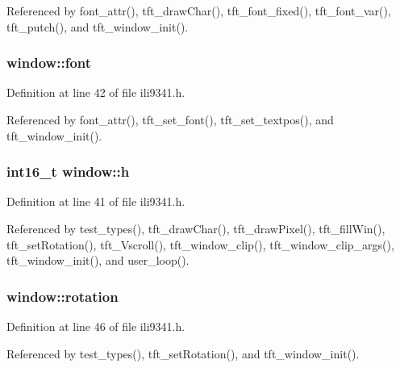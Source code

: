 Referenced by font\+\_\+attr(), tft\+\_\+draw\+Char(), tft\+\_\+font\+\_\+fixed(), tft\+\_\+font\+\_\+var(), tft\+\_\+putch(), and tft\+\_\+window\+\_\+init().

\subsubsection[{\texorpdfstring{font}{font}}]{ window\+::font}\hypertarget{structwindow_acee24e56db43557a46cbb5ca3fe35021}{}\label{structwindow_acee24e56db43557a46cbb5ca3fe35021}


Definition at line 42 of file ili9341.\+h.



Referenced by font\+\_\+attr(), tft\+\_\+set\+\_\+font(), tft\+\_\+set\+\_\+textpos(), and tft\+\_\+window\+\_\+init().

\subsubsection[{\texorpdfstring{h}{h}}]{\setlength{\rightskip}{0pt plus 5cm}int16\+\_\+t window\+::h}\hypertarget{structwindow_a822391abd5d09e6ce7152f68cff3ef2b}{}\label{structwindow_a822391abd5d09e6ce7152f68cff3ef2b}


Definition at line 41 of file ili9341.\+h.



Referenced by test\+\_\+types(), tft\+\_\+draw\+Char(), tft\+\_\+draw\+Pixel(), tft\+\_\+fill\+Win(), tft\+\_\+set\+Rotation(), tft\+\_\+\+Vscroll(), tft\+\_\+window\+\_\+clip(), tft\+\_\+window\+\_\+clip\+\_\+args(), tft\+\_\+window\+\_\+init(), and user\+\_\+loop().

\subsubsection[{\texorpdfstring{rotation}{rotation}}]{ window\+::rotation}\hypertarget{structwindow_afbd48ebcb41e68d0f458dac593578aa8}{}\label{structwindow_afbd48ebcb41e68d0f458dac593578aa8}


Definition at line 46 of file ili9341.\+h.



Referenced by test\+\_\+types(), tft\+\_\+set\+Rotation(), and tft\+\_\+window\+\_\+init().


